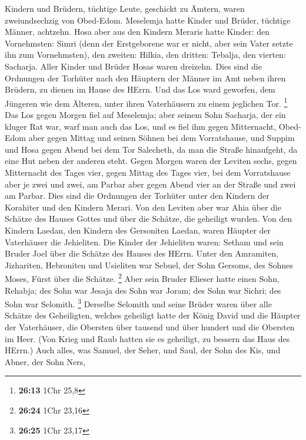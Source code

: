 Kindern und Brüdern, tüchtige Leute, geschickt zu Ämtern, waren
zweiundsechzig von Obed-Edom.  Meselemja hatte Kinder und
Brüder, tüchtige Männer, achtzehn.  Hosa aber aus den
Kindern Meraris hatte Kinder: den Vornehmsten: Simri (denn der
Erstgeborene war er nicht, aber sein Vater setzte ihn zum Vornehmsten),
 den zweiten: Hilkia, den dritten: Tebalja, den vierten:
Sacharja. Aller Kinder und Brüder Hosas waren dreizehn. 
Dies sind die Ordnungen der Torhüter nach den Häuptern der Männer im Amt
neben ihren Brüdern, zu dienen im Hause des HErrn.  Und das
Los ward geworfen, dem Jüngeren wie dem Älteren, unter ihren
Vaterhäusern zu einem jeglichen Tor. \footnote{\textbf{26:13} 1Chr 25,8}
 Das Los gegen Morgen fiel auf Meselemja; aber seinem Sohn
Sacharja, der ein kluger Rat war, warf man auch das Los, und es fiel ihm
gegen Mitternacht,  Obed-Edom aber gegen Mittag und seinen
Söhnen bei dem Vorratshause,  und Suppim und Hosa gegen
Abend bei dem Tor Salecheth, da man die Straße hinaufgeht, da eine Hut
neben der anderen steht.  Gegen Morgen waren der Leviten
sechs, gegen Mitternacht des Tages vier, gegen Mittag des Tages vier,
bei dem Vorratshause aber je zwei und zwei,  am Parbar aber
gegen Abend vier an der Straße und zwei am Parbar.  Dies
sind die Ordnungen der Torhüter unter den Kindern der Korahiter und den
Kindern Merari.  Von den Leviten aber war Ahia über die
Schätze des Hauses Gottes und über die Schätze, die geheiligt wurden.
 Von den Kindern Laedan, den Kindern des Gersoniten Laedan,
waren Häupter der Vaterhäuser die Jehieliten.  Die Kinder
der Jehieliten waren: Setham und sein Bruder Joel über die Schätze des
Hauses des HErrn.  Unter den Amramiten, Jizhariten,
Hebroniten und Usieliten  war Sebuel, der Sohn Gersoms, des
Sohnes Moses, Fürst über die Schätze. \footnote{\textbf{26:24} 1Chr
  23,16}  Aber sein Bruder Elieser hatte einen Sohn,
Rehabja; des Sohn war Jesaja des Sohn war Joram; des Sohn war Sichri;
des Sohn war Selomith. \footnote{\textbf{26:25} 1Chr 23,17}
 Derselbe Selomith und seine Brüder waren über alle Schätze
des Geheiligten, welches geheiligt hatte der König David und die Häupter
der Vaterhäuser, die Obersten über tausend und über hundert und die
Obersten im Heer.  (Von Krieg und Raub hatten sie es
geheiligt, zu bessern das Haus des HErrn.)  Auch alles, was
Samuel, der Seher, und Saul, der Sohn des Kis, und Abner, der Sohn Ners,
